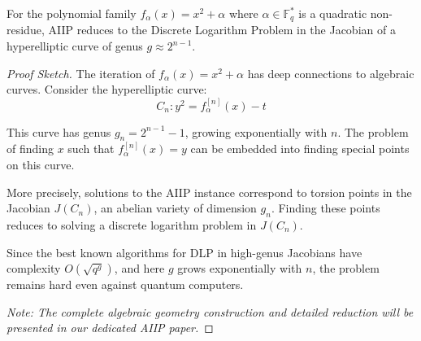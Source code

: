 \begin{theorem}\label{thm:aiip-dlp}
    For the polynomial family $f_\alpha(x) = x^2 + \alpha$ where $\alpha \in \mathbb{F}_q^*$ is a quadratic non-residue, AIIP reduces to the Discrete Logarithm Problem in the 
    Jacobian of a hyperelliptic curve of genus $g \approx 2^{n-1}$.
\end{theorem}

\begin{proof}[Proof Sketch]
    The iteration of $f_\alpha(x) = x^2 + \alpha$ has deep connections to algebraic curves. Consider the hyperelliptic curve:
    $$C_n: y^2 = f_\alpha^{[n]}(x) - t$$

    This curve has genus $g_n = 2^{n-1} - 1$, growing exponentially with $n$. The problem of finding $x$ such that $f_\alpha^{[n]}(x) = y$ can be embedded into finding special 
    points on this curve.

    More precisely, solutions to the AIIP instance correspond to torsion points in the Jacobian $J(C_n)$, an abelian variety of dimension $g_n$. Finding these points reduces 
    to solving a discrete logarithm problem in $J(C_n)$.

    Since the best known algorithms for DLP in high-genus Jacobians have complexity $O(\sqrt{q^g})$, and here $g$ grows exponentially with $n$, the problem remains hard 
    even against quantum computers.

    \textit{Note: The complete algebraic geometry construction and detailed reduction will be presented in our dedicated AIIP paper.}
\end{proof}


